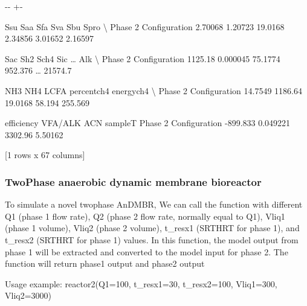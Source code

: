 \documentclass[a4paper,10pt,english]{sphinxmanual}
\newlength\nbsphinxcodecellspacing
\begin{document}
{

\kern-\sphinxverbatimsmallskipamount\kern-\baselineskip
\kern+\FrameHeightAdjust\kern-\fboxrule
\vspace{\nbsphinxcodecellspacing}

\begin{sphinxVerbatim}[commandchars=\\\{\}]
\llap{\color{nbsphinxout}[12]:\,\hspace{\fboxrule}\hspace{\fboxsep}}                          Ssu      Saa      Sfa      Sva      Sbu     Spro   \textbackslash{}
Phase 2 Configuration  2.70068  1.20723  19.0168  2.34856  3.01652  2.16597

                          Sac       Sh2     Sch4      Sic   {\ldots}     Alk   \textbackslash{}
Phase 2 Configuration  1125.18  0.000045  75.1774  952.376  {\ldots}  21574.7

                          NH3      NH4     LCFA    percentch4    energych4   \textbackslash{}
Phase 2 Configuration  14.7549  1186.64  19.0168        58.194      255.569

                       efficiency   VFA/ALK      ACN  sampleT
Phase 2 Configuration    -899.833  0.049221  3302.96  5.50162

[1 rows x 67 columns]
\end{sphinxVerbatim}
}


\subsubsection{Two\sphinxhyphen{}Phase anaerobic dynamic membrane bioreactor}
\label{\detokenize{jupyter_notebook/ADM1F_SRT_2phase:Two-Phase-anaerobic-dynamic-membrane-bioreactor}}
\sphinxAtStartPar
To simulate a novel two\sphinxhyphen{}phase AnDMBR, We can call the function  with different Q1 (phase 1 flow rate), Q2 (phase 2 flow rate, normally equal to Q1), Vliq1 (phase 1 volume), Vliq2 (phase 2 volume), t\_resx1 (SRT\sphinxhyphen{}HRT for phase 1), and t\_resx2 (SRT\sphinxhyphen{}HRT for phase 1) values. In this function, the model output from phase 1 will be extracted and converted to the model input for phase 2. The function will return phase1 output and phase2 output

\sphinxAtStartPar
Usage example: reactor2(Q1=100, t\_resx1=30, t\_resx2=100, Vliq1=300, Vliq2=3000)
\end{document}
